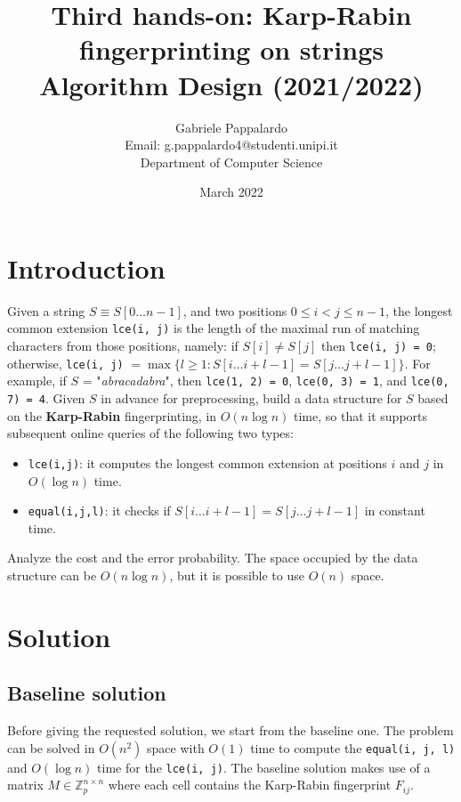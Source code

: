 \documentclass{article}
\title{Third hands-on: Karp-Rabin fingerprinting on strings \\[1ex] \large Algorithm Design (2021/2022)}
\author{Gabriele Pappalardo\\Email: g.pappalardo4@studenti.unipi.it\\Department of Computer Science}
\date{March 2022}
\begin{document}
\maketitle

\section{Introduction}

Given a string $S \equiv S[0 \dots n - 1]$, and two positions $0 \le i < j \le n - 1$, the longest common extension \verb+lce(i, j)+ is the length of the maximal run of matching characters from those positions, namely: if $S[i] \ne S[j]$ then \verb+lce(i, j) = 0+; otherwise, \verb+lce(i, j)+ $= \max \{l \ge 1 : S[i \dots i + l − 1] = S[j \dots j + l − 1]\}$. For example, if $S$ = "\textit{abracadabra}", then \verb+lce(1, 2) = 0+, \verb+lce(0, 3) = 1+, and \verb+lce(0, 7) = 4+. Given $S$ in advance for preprocessing, build a data structure for $S$ based on the \textbf{Karp-Rabin} fingerprinting, in $O(n \log n)$ time, so that it supports subsequent online queries of the following two types: 

\begin{itemize}
    \item \verb+lce(i,j)+: it computes the longest common extension at positions $i$ and $j$ in $O(\log n)$ time. 
    \item \verb+equal(i,j,l)+: it checks if $S[i \dots i+l - 1]=S[j \dots j+l - 1]$ in constant time. 
\end{itemize}

\noindent Analyze the cost and the error probability. The space occupied by the data structure can be $O(n \log n)$, but it is possible to use $O(n)$ space.  

\section{Solution}

\subsection{Baseline solution}

Before giving the requested solution, we start from the baseline one. The problem can be solved in $O(n^2)$ space with $O(1)$ time to compute the \verb+equal(i, j, l)+ and $O(\log n)$ time for the \verb+lce(i, j)+. The baseline solution makes use of a matrix $M \in \mathbb{Z}_p^{n \times n}$ where each cell contains the Karp-Rabin fingerprint $F_{ij}$.
\end{document}

